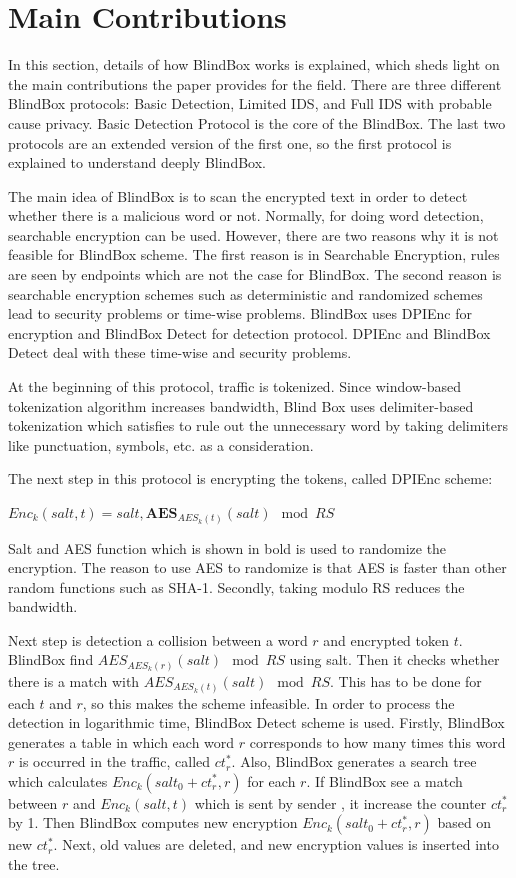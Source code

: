 \documentclass{winslabreport}
\begin{document}
\section{Main Contributions} \label{maincontributions}

In this section, details of how BlindBox works is explained, which sheds light on the main contributions the paper provides for the field. There are three different BlindBox protocols: Basic Detection, Limited IDS, and Full IDS with probable cause privacy. Basic Detection Protocol is the core of the BlindBox. The last two protocols are an extended version of the first one, so the first protocol is explained to understand deeply BlindBox.
  
The main idea of BlindBox is to scan the encrypted text in order to detect whether there is a malicious word or not. Normally, for doing word detection, searchable encryption can be used. However, there are two reasons why it is not feasible for BlindBox scheme. The first reason is in Searchable Encryption, rules are seen by endpoints which are not the case for BlindBox. The second reason is searchable encryption schemes such as deterministic and randomized schemes lead to security problems or time-wise problems. BlindBox uses DPIEnc for encryption and BlindBox Detect for detection protocol. DPIEnc and BlindBox Detect deal with these time-wise and security problems.

At the beginning of this protocol, traffic is tokenized. Since window-based tokenization algorithm increases bandwidth, Blind Box uses delimiter-based tokenization which satisfies to rule out the unnecessary word by taking delimiters like punctuation, symbols, etc. as a consideration.

The next step in this protocol is encrypting the tokens, called DPIEnc scheme: 
\begin{center}
	$Enc_k(salt,t)= salt, \textbf{AES}_{AES_k(t)}(salt) \mod RS$
\end{center} Salt and AES function which is shown in bold is used to randomize the encryption. The reason to use AES to randomize is that AES is faster than other random functions such as SHA-1. Secondly, taking modulo RS reduces the bandwidth.

Next step is detection a collision between a word $r$ and encrypted token $t$. BlindBox find $AES_{AES_k(r)}(salt) \mod RS$ using salt. Then it checks whether there is a match with $AES_{AES_k(t)}(salt) \mod RS$. This has to be done for each $t$ and $r$, so this makes the scheme infeasible. In order to process the detection in logarithmic time, BlindBox Detect scheme is used. Firstly, BlindBox generates a table in which each word $r$ corresponds to how many times this word $r$ is occurred in the traffic, called $ct_r^*$. Also, BlindBox generates a search tree which calculates $Enc_k(salt_0+ct_r^*,r)$ for each $r$. If BlindBox see a match between $r$ and $Enc_k(salt,t)$ which is sent by sender , it increase the counter $ct_r^*$ by 1. Then BlindBox computes new encryption $Enc_k(salt_0+ct_r^*,r)$ based on new $ct_r^*$.  Next, old values are deleted, and new encryption values is inserted into the tree.
  
\end{document}
